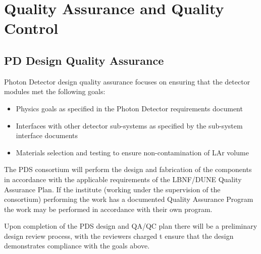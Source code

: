 \section{Quality Assurance and Quality Control}
\label{sec:fdsp-pd-qaqc}




\subsection{PD Design Quality Assurance}
\label{sec:fdsp-pd-designqa}

Photon Detector design quality assurance focuses on ensuring that the detector modules met the following goals:
\begin{itemize}
\item Physics goals as specified in the Photon Detector requirements document
\item Interfaces with other detector sub-systems as specified by the sub-system interface documents
\item Materials selection and testing to ensure non-contamination of LAr volume
\end{itemize}

The PDS consortium will perform the design and fabrication of the components in accordance with the applicable requirements of the LBNF/DUNE Quality Assurance Plan. If the institute (working under the supervision of the consortium) performing the work has a documented Quality Assurance Program the work may be performed in accordance with their own program.

Upon completion of the PDS design and QA/QC plan there will be a preliminary design review process, with the reviewers charged t ensure that the design demonstrates compliance with the goals above.

